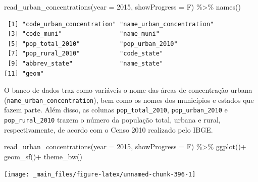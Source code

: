 \documentclass[
  brazilian,
]{book}
\newenvironment{Shaded}{\begin{snugshade}}{\end{snugshade}}
\newcommand{\AttributeTok}[1]{\textcolor[rgb]{0.77,0.63,0.00}{#1}}
\newcommand{\DecValTok}[1]{\textcolor[rgb]{0.00,0.00,0.81}{#1}}
\newcommand{\FunctionTok}[1]{\textcolor[rgb]{0.00,0.00,0.00}{#1}}
\newcommand{\NormalTok}[1]{#1}
\newcommand{\SpecialCharTok}[1]{\textcolor[rgb]{0.00,0.00,0.00}{#1}}
\begin{document}
\begin{Shaded}
\begin{Highlighting}[]
\FunctionTok{read\_urban\_concentrations}\NormalTok{(}\AttributeTok{year =} \DecValTok{2015}\NormalTok{, }\AttributeTok{showProgress =}\NormalTok{ F) }\SpecialCharTok{\%\textgreater{}\%} \FunctionTok{names}\NormalTok{()}
\end{Highlighting}
\end{Shaded}

\begin{verbatim}
 [1] "code_urban_concentration" "name_urban_concentration"
 [3] "code_muni"                "name_muni"               
 [5] "pop_total_2010"           "pop_urban_2010"          
 [7] "pop_rural_2010"           "code_state"              
 [9] "abbrev_state"             "name_state"              
[11] "geom"                    
\end{verbatim}

O banco de dados traz como variáveis o nome das áreas de concentração urbana (\texttt{name\_urban\_concentration}), bem como os nomes dos municípios e estados que fazem parte. Além disso, as colunas \texttt{pop\_total\_2010}, \texttt{pop\_urban\_2010} e \texttt{pop\_rural\_2010} trazem o número da população total, urbana e rural, respectivamente, de acordo com o Censo 2010 realizado pelo IBGE.

\begin{Shaded}
\begin{Highlighting}[]
\FunctionTok{read\_urban\_concentrations}\NormalTok{(}\AttributeTok{year =} \DecValTok{2015}\NormalTok{,}
                          \AttributeTok{showProgress =}\NormalTok{ F) }\SpecialCharTok{\%\textgreater{}\%} 
  \FunctionTok{ggplot}\NormalTok{()}\SpecialCharTok{+}
  \FunctionTok{geom\_sf}\NormalTok{()}\SpecialCharTok{+}
  \FunctionTok{theme\_bw}\NormalTok{()}
\end{Highlighting}
\end{Shaded}

\begin{center}\texttt{[image: \_main\_files/figure-latex/unnamed-chunk-396-1]} \end{center}
\end{document}
